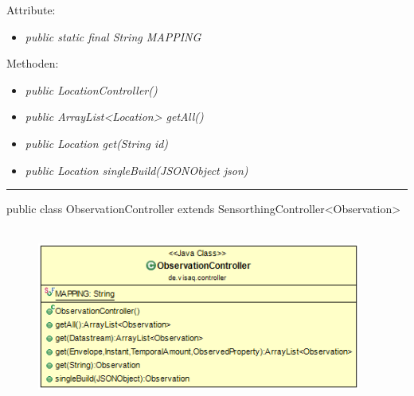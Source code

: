 Attribute:
\begin{itemize}
    \item \emph{public static final String MAPPING} \mappingDescription
\end{itemize}
Methoden:
\begin{itemize}
    \item \emph{public LocationController()}
    \item \emph{public ArrayList<Location> getAll()}
    \extendsSensorthingController
    \item \emph{public Location get(String id)}
    \extendsSensorthingController
    \item \emph{public Location singleBuild(JSONObject json)}
    \extendsSensorthingController
\end{itemize}
\clearpage %
\rule{\textwidth}{0.4pt}
public class ObservationController extends SensorthingController<Observation>
\\\\
\begin{minipage}{0.5\textwidth}
    \begin{figure}[H]
        {\centering\includegraphics[width=0.95\textwidth]{media/backend/controller/classes/ObservationController.png}}
    \end{figure}
    \end{minipage} \hfill
\begin{minipage}{0.5\textwidth}
\end{minipage}

